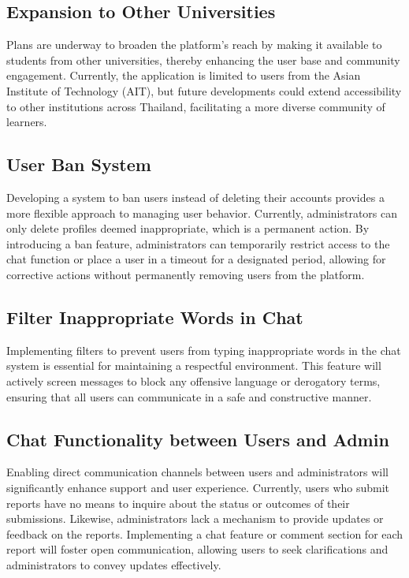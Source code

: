 \subsection{Expansion to Other Universities}
Plans are underway to broaden the platform's reach by making it available to students from other universities, thereby enhancing the user base and community engagement. Currently, the application is limited to users from the Asian Institute of Technology (AIT), but future developments could extend accessibility to other institutions across Thailand, facilitating a more diverse community of learners.

\subsection{User Ban System}
Developing a system to ban users instead of deleting their accounts provides a more flexible approach to managing user behavior. Currently, administrators can only delete profiles deemed inappropriate, which is a permanent action. By introducing a ban feature, administrators can temporarily restrict access to the chat function or place a user in a timeout for a designated period, allowing for corrective actions without permanently removing users from the platform.

\subsection{Filter Inappropriate Words in Chat}
Implementing filters to prevent users from typing inappropriate words in the chat system is essential for maintaining a respectful environment. This feature will actively screen messages to block any offensive language or derogatory terms, ensuring that all users can communicate in a safe and constructive manner.

\subsection{Chat Functionality between Users and Admin}
Enabling direct communication channels between users and administrators will significantly enhance support and user experience. Currently, users who submit reports have no means to inquire about the status or outcomes of their submissions. Likewise, administrators lack a mechanism to provide updates or feedback on the reports. Implementing a chat feature or comment section for each report will foster open communication, allowing users to seek clarifications and administrators to convey updates effectively.

